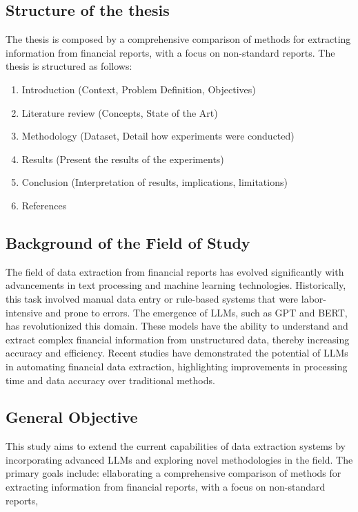 \documentclass[english, 12pt, a4paper, elec, utf8, a-2b, online]{aaltothesis}
\begin{document}
\thispagestyle{empty}

\subsection{Structure of the thesis}

The thesis is composed by a comprehensive comparison of methods for extracting information from financial reports, with a focus on non-standard reports. The thesis is structured as follows:

\begin{enumerate}
    \item \label{list:intro} Introduction (Context, Problem Definition, Objectives)
    \item Literature review (Concepts, State of the Art)
    \item Methodology (Dataset, Detail how experiments were conducted)
    \item Results (Present the results of the experiments)
    \item Conclusion (Interpretation of results, implications, limitations)
    \item References
\end{enumerate}

\subsection{Background of the Field of Study}

The field of data extraction from financial reports has evolved significantly with advancements in text processing and machine learning technologies. Historically, this task involved manual data entry or rule-based systems that were labor-intensive and prone to errors. The emergence of \ac{LLM}s, such as \ac{GPT} and \ac{BERT}, has revolutionized this domain. These models have the ability to understand and extract complex financial information from unstructured data, thereby increasing accuracy and efficiency. Recent studies have demonstrated the potential of \ac{LLM}s in automating financial data extraction, highlighting improvements in processing time and data accuracy over traditional methods.

\subsection{General Objective}

This study aims to extend the current capabilities of data extraction systems by incorporating advanced \ac{LLM}s and exploring novel methodologies in the field.
The primary goals include: ellaborating a comprehensive comparison of methods for extracting information from financial reports, with a focus on non-standard reports,
\end{document}
